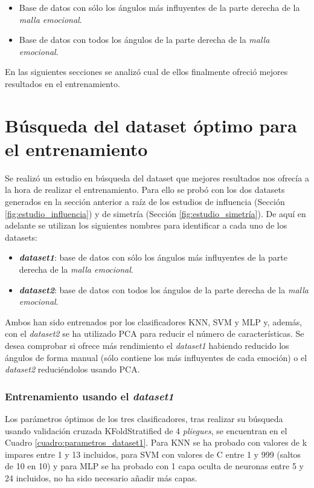 \begin{itemize}
    \item Base de datos con sólo los ángulos más influyentes de la parte derecha de la \textit{malla emocional}.
    \item Base de datos con todos los ángulos de la parte derecha de la \textit{malla emocional}.
\end{itemize}

En las siguientes secciones se analizó cual de ellos finalmente ofreció mejores resultados en el entrenamiento.

\section{Búsqueda del dataset óptimo para el entrenamiento}
\label{sec:estudio_dataset_optimo}

Se realizó un estudio en búsqueda del dataset que mejores resultados nos ofrecía a la hora de realizar el entrenamiento. Para ello se probó con los dos datasets generados en la sección anterior a raíz de los estudios de influencia (Sección \ref{fig:estudio_influencia}) y de simetría (Sección \ref{fig:estudio_simetría}). De aquí en adelante se utilizan los siguientes nombres para identificar a cada uno de los datasets:

\begin{itemize}
    \item \textbf{\textit{dataset1}}: base de datos con sólo los ángulos más influyentes de la parte derecha de la \textit{malla emocional}.
    \item \textbf{\textit{dataset2}}: base de datos con todos los ángulos de la parte derecha de la \textit{malla emocional}.
\end{itemize}

Ambos han sido entrenados por los clasificadores KNN, SVM y MLP y, además, con el \textit{dataset2} se ha utilizado PCA para reducir el número de características. Se desea comprobar si ofrece más rendimiento el \textit{dataset1} habiendo reducido los ángulos de forma manual (sólo contiene los más influyentes de cada emoción) o el \textit{dataset2} reduciéndolos usando PCA.

\subsubsection{Entrenamiento usando el \textit{dataset1}}

Los parámetros óptimos de los tres clasificadores, tras realizar su búsqueda usando validación cruzada KFoldStratified de 4 \textit{pliegues}, se encuentran en el Cuadro \ref{cuadro:parametros_dataset1}. Para KNN se ha probado con valores de k impares entre 1 y 13 incluidos, para SVM con valores de C entre 1 y 999 (saltos de 10 en 10) y para MLP se ha probado con 1 capa oculta de neuronas entre 5 y 24 incluidos, no ha sido necesario añadir más capas.\\

